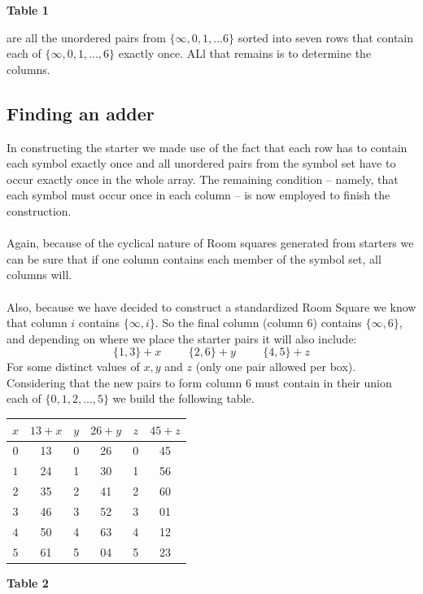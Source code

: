 \documentclass[
  12pt,
  a4paper]{book}
\begin{document}
\textbf{Table 1}

are all the unordered pairs from \(\{\infty,0,1,...6\}\) sorted into seven
rows that contain each of \(\{\infty,0,1,...,6\}\) exactly once. ALl that
remains is to determine the columns.

\hypertarget{finding-an-adder}{%
\subsection{Finding an adder}\label{finding-an-adder}}

In constructing the starter we made use of the fact that each row has to
contain each symbol exactly once and all unordered pairs from the symbol
set have to occur exactly once in the whole array. The remaining
condition -- namely, that each symbol must occur once in each column -- is
now employed to finish the construction.\\
~\\
Again, because of the cyclical nature of Room squares generated from
starters we can be sure that if one column contains each member of the
symbol set, all columns will.\\
~\\
Also, because we have decided to construct a standardized Room Square we
know that column \(i\) contains \(\{\infty,i\}\). So the final column
(column 6) contains \(\{\infty,6\}\), and depending on where we place the
starter pairs it will also include:
\[\{1,3\}+x \hspace{1cm} \{2,6\}+y \hspace{1cm} \{4,5\}+z\] For some
distinct values of \(x,y\) and \(z\) (only one pair allowed per box).\\
Considering that the new pairs to form column 6 must contain in their
union each of \(\{0,1,2,...,5\}\) we build the following table.

\begin{longtable}[]{@{}cccccc@{}}
\toprule
\(x\) & \(13+x\) & \(y\) & \(26+y\) & \(z\) & \(45+z\)\tabularnewline
\midrule
\endhead
\(0\) & 13 & 0 & 26 & 0 & 45\tabularnewline
\(1\) & 24 & 1 & 30 & 1 & 56\tabularnewline
\(2\) & 35 & 2 & 41 & 2 & 60\tabularnewline
\(3\) & 46 & 3 & 52 & 3 & 01\tabularnewline
\(4\) & 50 & 4 & 63 & 4 & 12\tabularnewline
\(5\) & 61 & 5 & 04 & 5 & 23\tabularnewline
\bottomrule
\end{longtable}

\textbf{Table 2}
\end{document}
